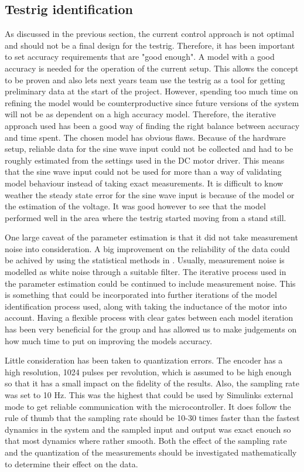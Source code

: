 \subsection{Testrig identification}
As discussed in the previous section, the current control approach is not
optimal and should not be a final design for the testrig. Therefore, it has been
important to set accuracy requirements that are "good enough". A model with a
good accuracy is needed for the operation of the current setup. This allows the
concept to be proven and also lets next years team use the testrig as a tool for
getting preliminary data at the start of the project. However, spending too much
time on refining the model would be counterproductive since future versions of
the system will not be as dependent on a high accuracy model. Therefore, the
iterative approach used has been a good way of finding the right balance between
accuracy and time spent. The chosen model has obvious flaws.  Because of the
hardware setup, reliable data for the sine wave input could not be collected and
had to be roughly estimated from the settings used in the DC motor driver. This
means that the sine wave input could not be used for more than a way of
validating model behaviour instead of taking exact measurements.  It is
difficult to know weather the steady state error for the sine wave input is
because of the model or the estimation of the voltage.  It was good however to
see that the model performed well in the area where the testrig started moving
from a stand still. 

One large caveat of the parameter estimation is that it did not take measurement
noise into consideration. A big improvement on the reliability of the data could
be achived by using the statistical methods in \cite{modeling1994}. Usually,
measurement noise is modelled as white noise through a suitable filter. The
iterative process used in the parameter estimation could be continued to include
measurement noise. This is something that could be incorporated into further
iterations of the model identification process used, along with taking the
inductance of the motor into account. Having a flexible process with clear gates
between each model iteration has been very beneficial for the group and has
allowed us to make judgements on how much time to put on improving the models
accuracy.

Little consideration has been taken to quantization errors. The
encoder has a high resolution, 1024 pulses per revolution, which is assumed to
be high enough so that it has a small impact on the fidelity of the results.
Also, the sampling rate was set to 10 Hz. This was the highest that could be
used by Simulinks external mode to get reliable communication with the
microcontroller. It does follow the rule of thumb that the sampling rate should
be 10-30 times faster than the fastest dynamics in the system and the sampled
input and output was exact enouch so that most dynamics where rather smooth.
Both the effect of the sampling rate and the quantization of the measurements
should be investigated mathematically to determine their effect on the data.


